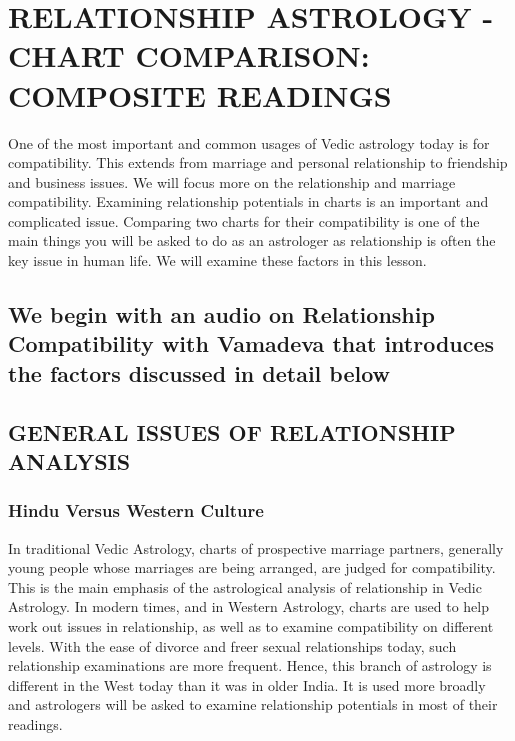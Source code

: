 \section{RELATIONSHIP ASTROLOGY -
CHART COMPARISON: COMPOSITE READINGS}
 

One of the most important and common usages of Vedic astrology today is for compatibility. This extends from marriage and personal relationship to friendship and business issues. We will focus more on the relationship and marriage compatibility. Examining relationship potentials in charts is an important and complicated issue. Comparing two charts for their compatibility is one of the main things you will be asked to do as an astrologer as relationship is often the key issue in human life. We will examine these factors in this lesson.

 



\subsection{\textbf{We begin with an audio on Relationship Compatibility with Vamadeva that introduces the factors discussed in detail below}}

 

\subsection{GENERAL ISSUES OF RELATIONSHIP ANALYSIS}
 

\subsubsection{Hindu Versus Western Culture}

 

In traditional Vedic Astrology, charts of prospective marriage partners, generally young people whose marriages are being arranged, are judged for compatibility. This is the main emphasis of the astrological analysis of relationship in Vedic Astrology. In modern times, and in Western Astrology, charts are used to help work out issues in relationship, as well as to examine compatibility on different levels. With the ease of divorce and freer sexual relationships today, such relationship examinations are more frequent. Hence, this branch of astrology is different in the West today than it was in older India. It is used more broadly and astrologers will be asked to examine relationship potentials in most of their readings.

